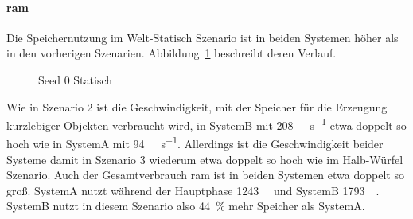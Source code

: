 \paragraph{\ac{ram}}
Die Speichernutzung im Welt-Statisch Szenario ist in beiden Systemen höher als in den vorherigen Szenarien. Abbildung~\ref{fig:seed-0-static-mem} beschreibt deren Verlauf. 
\begin{figure}[!htbp]
	\caption{Seed 0 Statisch}\label{fig:seed-0-static-mem}
\end{figure} 
Wie in Szenario 2 ist die Geschwindigkeit, mit der Speicher für die Erzeugung kurzlebiger Objekten verbraucht wird, in SystemB mit \SI{208}{\mega\byte\per\second} etwa doppelt so hoch wie in SystemA mit \SI{94}{\mega\byte\per\second}. Allerdings ist die Geschwindigkeit beider Systeme damit in Szenario 3 wiederum etwa doppelt so hoch wie im Halb-Würfel Szenario.
Auch der Gesamtverbrauch \ac{ram} ist in beiden Systemen etwa doppelt so groß. SystemA nutzt während der Hauptphase \SI{1243}{\mega\byte} und SystemB \SI{1793}{\mega\byte}. SystemB nutzt in diesem Szenario also \SI{44}{\percent} mehr Speicher als SystemA.   